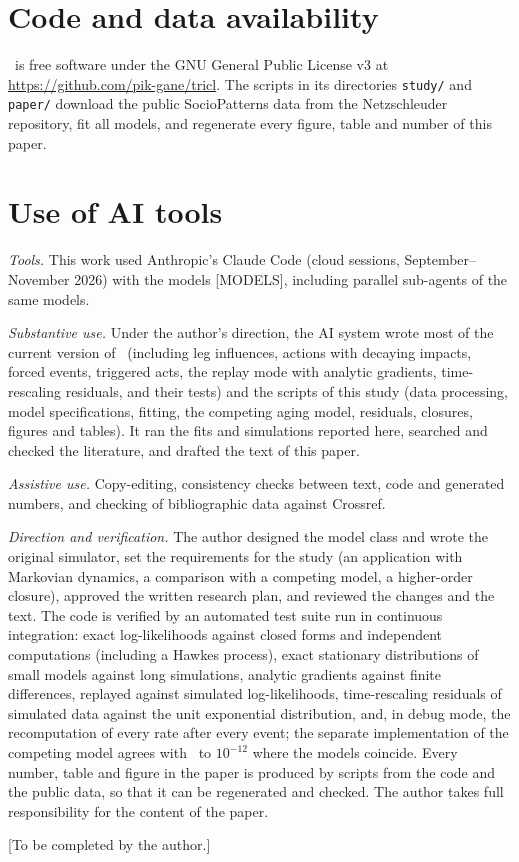 \section*{Code and data availability}
\tricl\ is free software under the GNU General Public License v3 at \url{https://github.com/pik-gane/tricl}.
The scripts in its directories \texttt{study/} and \texttt{paper/} download the public SocioPatterns data from the Netzschleuder repository, fit all models, and regenerate every figure, table and number of this paper.

\section*{Use of AI tools}
\emph{Tools.} This work used Anthropic's Claude Code (cloud sessions, September--November 2026) with the models [MODELS], including parallel sub-agents of the same models.

\emph{Substantive use.} Under the author's direction, the AI system wrote most of the current version of \tricl\ (including leg influences, actions with decaying impacts, forced events, triggered acts, the replay mode with analytic gradients, time-rescaling residuals, and their tests) and the scripts of this study (data processing, model specifications, fitting, the competing aging model, residuals, closures, figures and tables).
It ran the fits and simulations reported here, searched and checked the literature, and drafted the text of this paper.

\emph{Assistive use.} Copy-editing, consistency checks between text, code and generated numbers, and checking of bibliographic data against Crossref.

\emph{Direction and verification.} The author designed the model class and wrote the original simulator, set the requirements for the study (an application with Markovian dynamics, a comparison with a competing model, a higher-order closure), approved the written research plan, and reviewed the changes and the text.
The code is verified by an automated test suite run in continuous integration: exact log-likelihoods against closed forms and independent computations (including a Hawkes process), exact stationary distributions of small models against long simulations, analytic gradients against finite differences, replayed against simulated log-likelihoods, time-rescaling residuals of simulated data against the unit exponential distribution, and, in debug mode, the recomputation of every rate after every event; the separate implementation of the competing model agrees with \tricl\ to $10^{-12}$ where the models coincide.
Every number, table and figure in the paper is produced by scripts from the code and the public data, so that it can be regenerated and checked.
The author takes full responsibility for the content of the paper.

\begin{acknowledgments}
[To be completed by the author.]
\end{acknowledgments}

